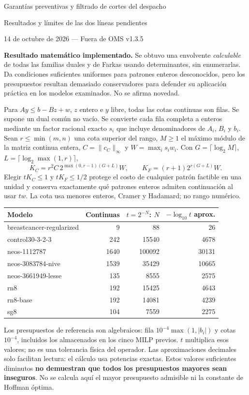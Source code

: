\documentclass[10pt,a4paper]{article}
\begin{document}
\begin{center}
{\Large Garantías preventivas y filtrado de cortes del despacho}\par
{\large Resultados y límites de las dos líneas pendientes}\par
14 de octubre de 2026 --- Fuera de OMS v1.3.5
\end{center}

\textbf{Resultado matemático implementado.} Se obtuvo una envolvente
\emph{calculable} de todas las familias duales y de Farkas usando determinantes,
sin enumerarlas. Da condiciones suficientes uniformes para patrones enteros
desconocidos, pero los presupuestos resultan demasiado conservadores para
defender su aplicación práctica en los modelos examinados. No se afirma novedad.

Para $Ay\le b-Bz+w$, $z$ entero e $y$ libre, todas las cotas continuas son filas.
Se supone un dual común no vacío. Se convierte cada fila completa a enteros
mediante un factor racional exacto $s_i$ que incluye denominadores de $A_i$,
$B_i$ y $b_i$. Sean $r\le\min(m,n)$ una cota superior del rango, $M\ge1$ el
máximo módulo de la matriz continua entera, $C=\|c_C\|_\infty$ y
$W=\max_i s_iw_i$. Con $G=\lceil\log_2M\rceil$, $L=\lceil\log_2\max(1,r)\rceil$,
\[
 K_C=r^2 C\,2^{\max(0,r-1)(G+L)}W,\qquad
 K_F=(r+1)2^{r(G+L)}W.
\]
Elegir $tK_C\le1$ y $tK_F\le1/2$ protege el costo de cualquier patrón factible
en una unidad y conserva exactamente qué patrones enteros admiten continuación
al usar $tw$. La cota usa menores enteros, Cramer y Hadamard; no rango numérico.

\begin{center}\small
\begin{tabular}{lrrr}\toprule
Modelo & Continuas & $t=2^{-N}$: $N$ & $-\log_{10}t$ aprox.\\\midrule
breastcancer-regularized & 9 & 88 & 26 \\
control30-3-2-3 & 242 & 15540 & 4678 \\
neos-1112787 & 1640 & 100092 & 30131 \\
neos-3083784-nive & 1539 & 35429 & 10665 \\
neos-3661949-lesse & 135 & 8555 & 2575 \\
rn8 & 192 & 15425 & 4643 \\
rn8-base & 192 & 14081 & 4239 \\
sg8 & 104 & 7559 & 2275 \\
\bottomrule\end{tabular}
\end{center}
Los presupuestos de referencia son algebraicos: fila
$10^{-4}\max(1,|b_i|)$ y cotas $10^{-4}$, incluidos los almacenados en los cinco
MILP previos. $t$ multiplica esos valores; no es una tolerancia física del operador.
Las aproximaciones decimales solo facilitan lectura: el cálculo usa potencias
exactas. Estos valores suficientes diminutos \textbf{no demuestran que todos los
presupuestos mayores sean inseguros}. No se calcula aquí el mayor presupuesto
admisible ni la constante de Hoffman óptima.
\end{document}
